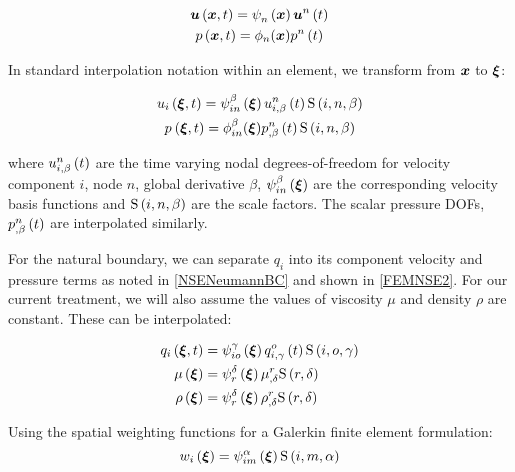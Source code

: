 \begin{gather}
  \fnof{\vect{u}}{\vect{x},t}=\gbfn{n}{}{\vect{x}}\fnof{\nodept{\vect{u}}{n}}{t}\\
  \fnof{p}{\vect{x},t}=\phi_{n}({\vect{x}})\fnof{\nodept{p}{n}}{t}
\end{gather}

In standard interpolation notation within an element, we transform from $\vect{x}$ to $\vect{\xi}$:

\begin{gather}
  \fnof{u_{i}}{\vect{\xi},t}=\idxgbfn{i}{n}{\beta}{\vect{\xi}}
  \fnof{\idxnodedof{u}{i}{n}{\beta}}{t}\idxgsf{i}{n}{\beta}\\
  \fnof{p_{}}{\vect{\xi},t}=\phi_{in}^{\beta}({\vect{\xi}})
  \fnof{\idxnodedof{p}{}{n}{\beta}}{t}\idxgsf{i}{n}{\beta}
\end{gather}

where $\fnof{\idxnodedof{u}{i}{n}{\beta}}{t}$ are the time varying nodal degrees-of-freedom for velocity component $i$, node $n$, global derivative $\beta$, $\idxgbfn{i}{n}{\beta}{\vect{\xi}}$ are the corresponding velocity basis functions and $\idxgsf{i}{n}{\beta}$ are the scale factors. The scalar pressure DOFs, $\fnof{\idxnodedof{p}{}{n}{\beta}}{t}$ are interpolated similarly.

For the natural boundary, we can separate $q_i$ into its component velocity and pressure terms as noted in \eqref{NSENeumannBC} and shown in \eqref{FEMNSE2}. For our current treatment, we will also assume the values of viscosity $\mu$ and density $\rho$ are constant. These can be interpolated:

\begin{equation}
  \begin{split}
    \fnof{q_{i}}{\vect{\xi},t} &= \idxgbfn{i}{o}{\gamma}{\vect{\xi}}
      \fnof{\idxnodedof{q}{i}{o}{\gamma}}{t}\idxgsf{i}{o}{\gamma} \\
    \fnof{\mu}{\vect{\xi}} &=\gbfn{r}{\delta}{\vect{\xi}}
    \nodedof{\mu}{r}{\delta}\gsf{r}{\delta} \\
    \fnof{\rho}{\vect{\xi}} &=\gbfn{r}{\delta}{\vect{\xi}}\nodedof{\rho}{r}{\delta}
    \gsf{r}{\delta} \\
  \end{split}
\end{equation}

 Using the spatial weighting functions for a Galerkin finite element formulation:
\begin{equation}
  \fnof{w_{i}}{\vect{\xi}}=\idxgbfn{i}{m}{\alpha}{\vect{\xi}}\idxgsf{i}{m}{\alpha}
\end{equation}


